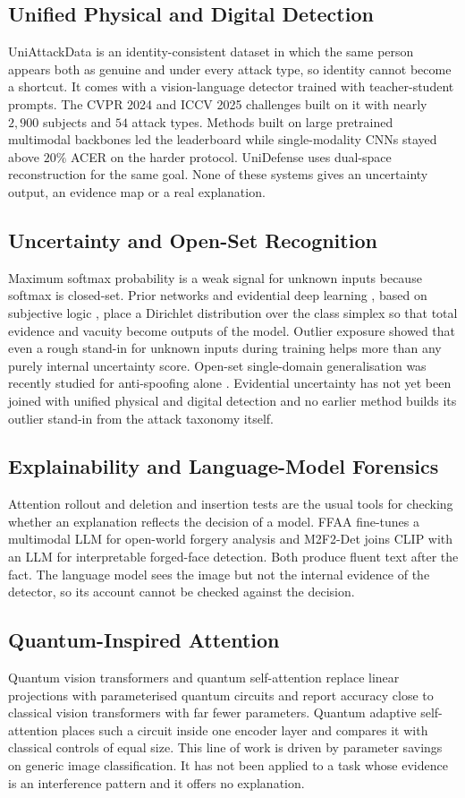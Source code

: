 \documentclass[conference]{IEEEtran}
\newcommand{\sub}[1]{\subsection{\texorpdfstring{\textbf{#1}}{#1}}}
\begin{document}
\sub{Unified Physical and Digital Detection}
UniAttackData \cite{yu2024unified} is an identity-consistent dataset in which the same
person appears both as genuine and under every attack type, so identity cannot become
a shortcut. It comes with a vision-language detector trained with teacher-student
prompts. The CVPR 2024 and ICCV 2025 challenges built on it
\cite{yuan2024challenge,ma2025uniattackplus} with nearly $2{,}900$ subjects and $54$
attack types. Methods built on large pretrained multimodal backbones led the
leaderboard while single-modality CNNs stayed above $20\%$ ACER on the harder
protocol. UniDefense \cite{zhang2024unidefense} uses dual-space reconstruction for the
same goal. None of these systems gives an uncertainty output, an evidence map or a
real explanation.

\sub{Uncertainty and Open-Set Recognition}
Maximum softmax probability \cite{hendrycks2017msp} is a weak signal for unknown inputs
because softmax is closed-set. Prior networks \cite{malinin2018prior} and evidential
deep learning \cite{sensoy2018edl}, based on subjective logic
\cite{josang2016subjective}, place a Dirichlet distribution over the class simplex so
that total evidence and vacuity become outputs of the model. Outlier exposure
\cite{hendrycks2019oe} showed that even a rough stand-in for unknown inputs during
training helps more than any purely internal uncertainty score. Open-set
single-domain generalisation was recently studied for anti-spoofing alone
\cite{liu2024openset}. Evidential uncertainty has not yet been joined with unified
physical and digital detection and no earlier method builds its outlier stand-in from
the attack taxonomy itself.

\sub{Explainability and Language-Model Forensics}
Attention rollout \cite{abnar2020rollout} and deletion and insertion tests
\cite{petsiuk2018rise} are the usual tools for checking whether an explanation
reflects the decision of a model. FFAA \cite{huang2024ffaa} fine-tunes a multimodal
LLM for open-world forgery analysis and M2F2-Det \cite{guo2025m2f2det} joins CLIP with
an LLM for interpretable forged-face detection. Both produce fluent text after the
fact. The language model sees the image but not the internal evidence of the
detector, so its account cannot be checked against the decision.

\sub{Quantum-Inspired Attention}
Quantum vision transformers \cite{cherrat2024qvt} and quantum self-attention
\cite{comajoan2024qgluon,evans2025on} replace linear projections with parameterised
quantum circuits and report accuracy close to classical vision transformers with far
fewer parameters. Quantum adaptive self-attention \cite{chen2025qasa} places such a
circuit inside one encoder layer and compares it with classical controls of equal
size. This line of work is driven by parameter savings on generic image
classification. It has not been applied to a task whose evidence is an interference
pattern and it offers no explanation.
\end{document}
